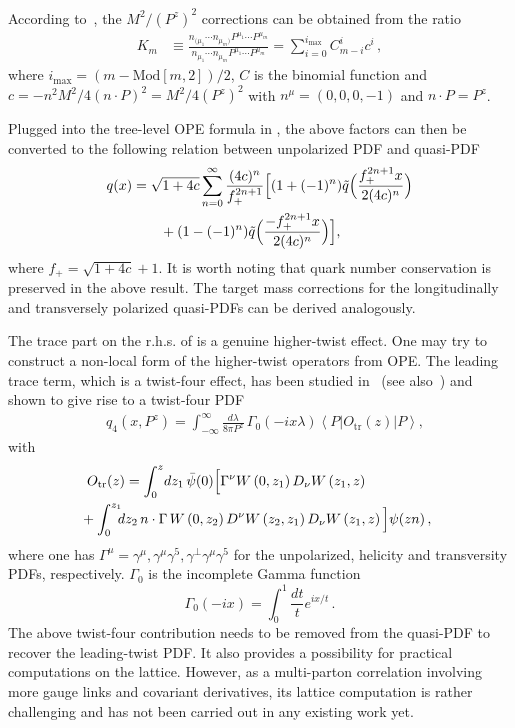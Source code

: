According to~\cite{Chen:2016utp}, the $M^2/(P^z)^2$ corrections can be obtained from the ratio
%
\begin{align}
	K_m  &\equiv
	\frac{n_{(\mu_1}\cdots n_{\mu_m)}
		P^{\mu_1}\cdots P^{\mu_m}}{n_{\mu_1}\cdots n_{\mu_m}
		P^{\mu_1}\cdots P^{\mu_m}} = \sum_{i=0}^{i_\text{max}} C_{m-i}^i c^i   \label{Kn}\,,
\end{align}
where $i_\text{max}=(m-\text{Mod}[m,2])/2$,
$C$ is the binomial function and
$c=-n^2 M^2/4\left(n\cdot P\right)^2 = M^2/4 (P^z)^2$
with $n^\mu = (0,0,0,-1)$ and $n \cdot P=P^z$.

Plugged into the tree-level OPE formula in , the above factors can then be converted to the following relation between unpolarized PDF and quasi-PDF~\cite{Chen:2016utp}
\begin{align}
	q(x)&=\sqrt{1+4c}\sum_{n=0}^\infty \frac{(4c)^n}{f_+^{2n+1}}\Big[(1+(-1)^n)\tilde q\Big(\frac{f_+^{2n+1}x}{2(4c)^n}\Big)\nonumber\\
	&\qquad+(1-(-1)^n)\tilde q\Big(\frac{-f_+^{2n+1}x}{2(4c)^n}\Big)\Big],
\end{align}
where $f_{+}=\sqrt{1+4c}+ 1$. It is worth noting that quark number conservation is preserved in the above result. The target mass corrections for the longitudinally and transversely polarized quasi-PDFs can be derived analogously.

The trace part on the r.h.s. of  is a genuine higher-twist effect. One may try to construct a non-local form of the higher-twist operators from OPE. The leading trace term, which is a twist-four effect, has been studied in~\cite{Chen:2016utp} (see also~\cite{Balitsky:1987bk}) and shown to give rise to a twist-four PDF
\begin{align}\label{tildeq-twist4}
	&{q}_\text{4}(x,P^z)
	=  \int_{-\infty}^\infty \!\frac{d\lambda}{8\pi P^z}\,
	\Gamma_0\left(-ix\lambda\right)
	\left\langle P\left\vert  O_\text{tr}(z)\right\vert P\right\rangle ,
\end{align}
with
\begin{align}
	&O_\text{tr}(z) =
	\int_0^z \!dz_1\, \bar{\psi}(0) \Big[
	\Gamma^\nu W\left(0,z_1\right) D_\nu W\left(z_1,z\right)\\
	&\hspace{-.5em}+ \int_0^{z_1} \!\! \! dz_2\,  n \cdot  \Gamma\,
	W\left(0,z_2\right) D^\nu W\left(z_2,z_1\right) D_\nu
	W\left(z_1,z\right) \Big] \psi(z n)\,,\nonumber
\end{align}
where one has $\Gamma^{\mu}=\gamma^{\mu}, \gamma^{\mu}\gamma^5, \gamma^\perp\gamma^{\mu}\gamma^5$ for the unpolarized, helicity and transversity PDFs, respectively. $\Gamma_0$ is the incomplete Gamma function
\begin{equation}
	\Gamma_0\left(-ix\right) = \int_0^1 \frac{dt}{t} e^{ix/t} \,.
\end{equation}
The above twist-four contribution needs to be removed from the quasi-PDF to recover the leading-twist PDF. It also provides a possibility for practical computations on the lattice. However, as a multi-parton correlation involving more gauge links and covariant derivatives, its lattice computation is rather challenging and has not been carried out in any existing work yet.


